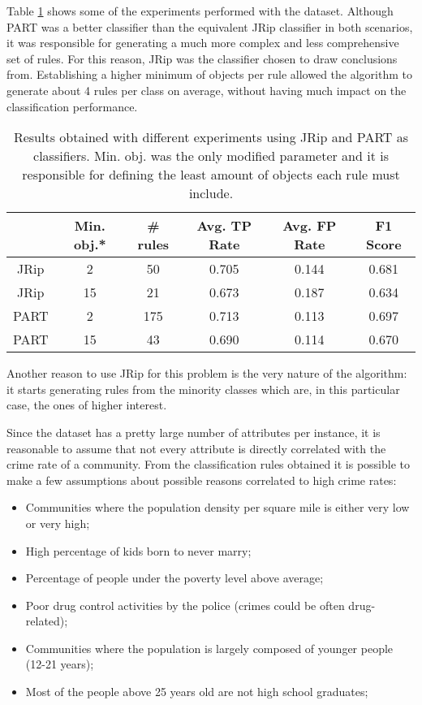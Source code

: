 \documentclass{article}
\begin{document}
Table \ref{tab:results} shows some of the experiments performed with the dataset. Although PART was a better classifier than the equivalent JRip classifier in both scenarios, it was responsible for generating a much more complex and less comprehensive set of rules. For this reason, JRip was the classifier chosen to draw conclusions from. Establishing a higher minimum of objects per rule allowed the algorithm to generate about 4 rules per class on average, without having much impact on the classification performance.


\begin{table}[htbp]
    \centering
    \begin{tabular}{c|c|c|c|c|c}
         &  Min. obj.* & \# rules & Avg. TP Rate & Avg. FP Rate & F1 Score \\ \hline
         JRip & 2 & 50 & 0.705 & 0.144 & 0.681 \\
         JRip & 15 & 21 & 0.673 & 0.187 & 0.634 \\
         PART & 2 & 175 & 0.713 & 0.113 & 0.697 \\
         PART & 15 & 43 & 0.690 & 0.114 & 0.670 \\
    \end{tabular}
    \caption{Results obtained with different experiments using JRip and PART as classifiers. Min. obj. was the only modified parameter and it is responsible for defining the least amount of objects each rule must include.}
    \label{tab:results}
\end{table}

Another reason to use JRip for this problem is the very nature of the algorithm: it starts generating rules from the minority classes which are, in this particular case, the ones of higher interest.

Since the dataset has a pretty large number of attributes per instance, it is reasonable to assume that not every attribute is directly correlated with the crime rate of a community. From the classification rules obtained it is possible to make a few assumptions about possible reasons correlated to high crime rates: 

\begin{itemize}
    \item Communities where the population density per square mile is either very low or very high;
    \item High percentage of kids born to never marry;
    \item Percentage of people under the poverty level above average;
    \item Poor drug control activities by the police (crimes could be often drug-related);
    \item Communities where the population is largely composed of younger people (12-21 years);
    \item Most of the people above 25 years old are not high school graduates;
\end{itemize}
\end{document}
